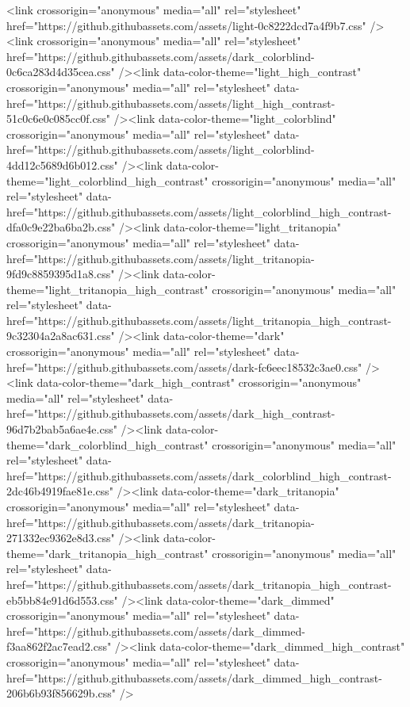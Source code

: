   <link crossorigin="anonymous" media="all" rel="stylesheet" href="https://github.githubassets.com/assets/light-0c8222dcd7a4f9b7.css" /><link crossorigin="anonymous" media="all" rel="stylesheet" href="https://github.githubassets.com/assets/dark_colorblind-0c6ca283d4d35cea.css" /><link data-color-theme="light_high_contrast" crossorigin="anonymous" media="all" rel="stylesheet" data-href="https://github.githubassets.com/assets/light_high_contrast-51c0c6e0c085cc0f.css" /><link data-color-theme="light_colorblind" crossorigin="anonymous" media="all" rel="stylesheet" data-href="https://github.githubassets.com/assets/light_colorblind-4dd12c5689d6b012.css" /><link data-color-theme="light_colorblind_high_contrast" crossorigin="anonymous" media="all" rel="stylesheet" data-href="https://github.githubassets.com/assets/light_colorblind_high_contrast-dfa0c9e22ba6ba2b.css" /><link data-color-theme="light_tritanopia" crossorigin="anonymous" media="all" rel="stylesheet" data-href="https://github.githubassets.com/assets/light_tritanopia-9fd9c8859395d1a8.css" /><link data-color-theme="light_tritanopia_high_contrast" crossorigin="anonymous" media="all" rel="stylesheet" data-href="https://github.githubassets.com/assets/light_tritanopia_high_contrast-9c32304a2a8ac631.css" /><link data-color-theme="dark" crossorigin="anonymous" media="all" rel="stylesheet" data-href="https://github.githubassets.com/assets/dark-fc6eec18532c3ae0.css" /><link data-color-theme="dark_high_contrast" crossorigin="anonymous" media="all" rel="stylesheet" data-href="https://github.githubassets.com/assets/dark_high_contrast-96d7b2bab5a6ae4e.css" /><link data-color-theme="dark_colorblind_high_contrast" crossorigin="anonymous" media="all" rel="stylesheet" data-href="https://github.githubassets.com/assets/dark_colorblind_high_contrast-2dc46b4919fae81e.css" /><link data-color-theme="dark_tritanopia" crossorigin="anonymous" media="all" rel="stylesheet" data-href="https://github.githubassets.com/assets/dark_tritanopia-271332ec9362e8d3.css" /><link data-color-theme="dark_tritanopia_high_contrast" crossorigin="anonymous" media="all" rel="stylesheet" data-href="https://github.githubassets.com/assets/dark_tritanopia_high_contrast-eb5bb84e91d6d553.css" /><link data-color-theme="dark_dimmed" crossorigin="anonymous" media="all" rel="stylesheet" data-href="https://github.githubassets.com/assets/dark_dimmed-f3aa862f2ac7ead2.css" /><link data-color-theme="dark_dimmed_high_contrast" crossorigin="anonymous" media="all" rel="stylesheet" data-href="https://github.githubassets.com/assets/dark_dimmed_high_contrast-206b6b93f856629b.css" />

